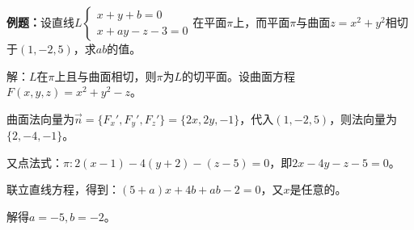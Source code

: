 \textbf{例题：}设直线$L\left\{\begin{array}{l}
    x+y+b=0 \\
    x+ay-z-3=0
\end{array}\right.$在平面$\pi$上，而平面$\pi$与曲面$z=x^2+y^2$相切于$(1,-2,5)$，求$ab$的值。

解：$L$在$\pi$上且与曲面相切，则$\pi$为$L$的切平面。设曲面方程$F(x,y,z)=x^2+y^2-z$。

曲面法向量为$\vec{n}=\{F_x',F_y',F_z'\}=\{2x,2y,-1\}$，代入$(1,-2,5)$，则法向量为$\{2,-4,-1\}$。

又点法式：$\pi:2(x-1)-4(y+2)-(z-5)=0$，即$2x-4y-z-5=0$。

联立直线方程，得到：$(5+a)x+4b+ab-2=0$，又$x$是任意的。

解得$a=-5,b=-2$。